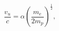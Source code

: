 \begin{equation}
\frac{v_u}{c}=\alpha\left(\frac{m_e}{2m_p}\right)^{\frac{1}{2}},
\label{v0}
\end{equation}


